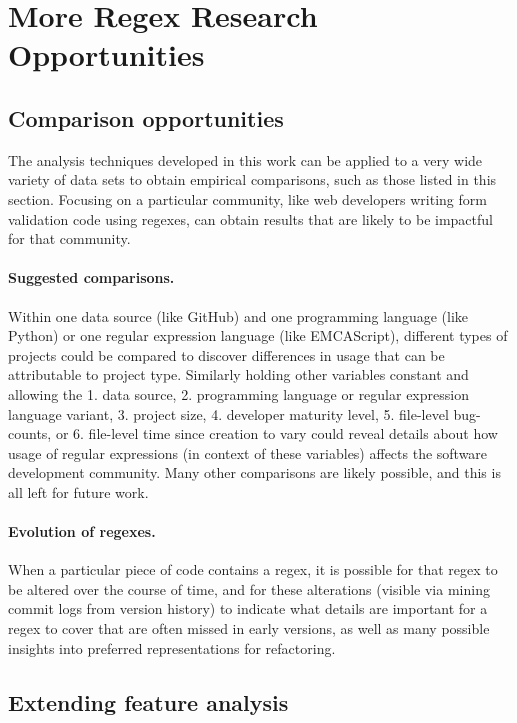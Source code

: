 \section{More Regex Research Opportunities}

\subsection{Comparison opportunities}
The analysis techniques developed in this work can be applied to a very wide variety of data sets to obtain empirical comparisons, such as those listed in this section.  Focusing on a particular community, like web developers writing form validation code using regexes, can obtain results that are likely to be impactful for that community.

\paragraph{Suggested comparisons.}  Within one data source (like GitHub) and one programming language (like Python) or one regular expression language (like EMCAScript), different types of projects could be compared to discover differences in usage that can be attributable to project type.  Similarly holding other variables constant and allowing the 1. data source, 2. programming language or regular expression language variant, 3. project size, 4. developer maturity level, 5. file-level bug-counts,  or 6. file-level time since creation to vary could reveal details about how usage of regular expressions (in context of these variables) affects the software development community. Many other comparisons are likely possible, and this is all left for future work.

\paragraph{Evolution of regexes.}  When a particular piece of code contains a regex, it is possible for that regex to be altered over the course of time, and for these alterations (visible via mining commit logs from version history) to indicate what details are important for a regex to cover that are often missed in early versions, as well as many possible insights into preferred representations for refactoring.


\subsection{Extending feature analysis}
